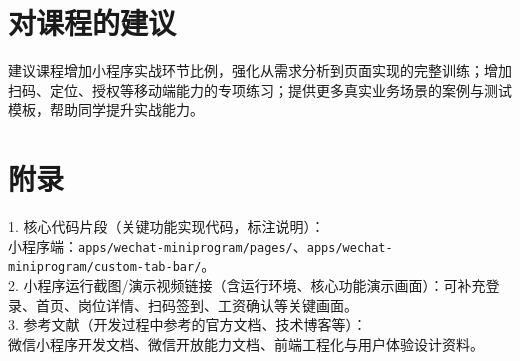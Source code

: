 ﻿\documentclass[UTF8,a4paper]{ctexart}
\begin{document}
\section{对课程的建议}
建议课程增加小程序实战环节比例，强化从需求分析到页面实现的完整训练；增加扫码、定位、授权等移动端能力的专项练习；提供更多真实业务场景的案例与测试模板，帮助同学提升实战能力。

\section{附录}
1. 核心代码片段（关键功能实现代码，标注说明）：\\
\quad 小程序端：\texttt{apps/wechat-miniprogram/pages/}、\texttt{apps/wechat-miniprogram/custom-tab-bar/}。\\
2. 小程序运行截图/演示视频链接（含运行环境、核心功能演示画面）：可补充登录、首页、岗位详情、扫码签到、工资确认等关键画面。\\
3. 参考文献（开发过程中参考的官方文档、技术博客等）：\\
\quad 微信小程序开发文档、微信开放能力文档、前端工程化与用户体验设计资料。
\end{document}
